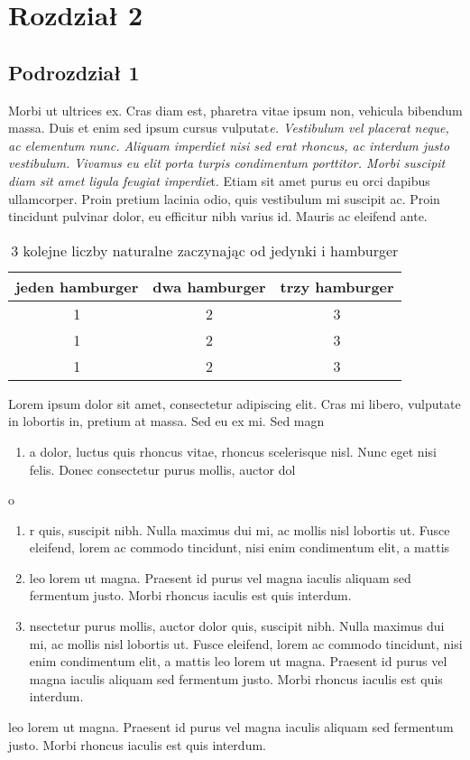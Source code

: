 \documentclass[12pt,a4paper]{article}
\begin{document}
\section{Rozdział 2}
\subsection{Podrozdział 1}
	Morbi ut ultrices ex. Cras diam est, pharetra vitae ipsum non, vehicula bibendum massa. Duis et enim sed ipsum cursus vulputat\textit{e. Vestibulum vel placerat neque, ac elementum nunc. Aliquam imperdiet nisi sed erat rhoncus, ac interdum justo vestibulum. Vivamus eu elit porta turpis condimentum porttitor. Morbi suscipit diam sit amet ligula feugiat imperdie}t. Etiam sit amet purus eu orci dapibus ullamcorper. Proin pretium lacinia odio, quis vestibulum mi suscipit ac. Proin tincidunt pulvinar dolor, eu efficitur nibh varius id. Mauris ac eleifend ante.
	\begin{table}[H]
		\centering
		\begin{tabular}{|c c c|} 
			\hline
			jeden hamburger & dwa hamburger & trzy hamburger \\
			\hline\hline
			1 & 2 & 3  \\ 
			\hline
			1 & 2 & 3  \\
			\hline
			1 & 2 & 3 \\ 
			\hline
		\end{tabular}
  \label{tabela}
	\caption{3 kolejne liczby naturalne zaczynając od jedynki i hamburger}
	\end{table}
	Lorem ipsum dolor sit amet, consectetur \cite{piec}adipiscing elit. Cras mi libero, vulputate in lobortis in, pretium at massa. Sed eu ex mi. Sed magn
\begin{enumerate}
\item a dolor, luctus quis rhoncus vitae, rhoncus scelerisque nisl. Nunc eget nisi felis. Donec consectetur purus mollis, auctor dol
\end{enumerate}
o
\begin{enumerate}
\item r quis, suscipit nibh. Nulla maximus dui mi, ac mollis nisl lobortis ut. Fusce eleifend, lorem ac commodo tincidunt, nisi enim condimentum elit, a mattis
\item leo lorem ut magna. Praesent id purus vel magna iaculis aliquam sed fermentum justo. Morbi rhoncus iaculis est quis interdum.
\item nsectetur purus mollis, auctor dolor quis, suscipit nibh. Nulla maximus dui mi, ac mollis nisl lobortis ut. Fusce eleifend, lorem ac commodo tincidunt, nisi enim condimentum elit, a mattis leo lorem ut magna. Praesent id purus vel magna iaculis aliquam sed fermentum justo. Morbi rhoncus iaculis est quis interdum.
\end{enumerate}
 leo lorem ut magna. Praesent id purus vel magna iaculis aliquam sed fermentum justo. Morbi rhoncus iaculis est quis interdum.
\end{document}
